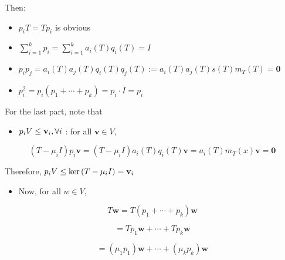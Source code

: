 \documentclass[11pt]{article}
\begin{document}
Then:

\begin{itemize}
\item \({p}_{i}T = T{p}_{i}\) is obvious
\end{itemize}

\begin{itemize}
\item \(\mathop{\sum }\limits_{{i = 1}}^{k}{p}_{i} = \mathop{\sum }\limits_{{i = 1}}^{k}{a}_{i}\left( T\right) {q}_{i}\left( T\right)  = I\)
\end{itemize}

\begin{itemize}
\item \({p}_{i}{p}_{j} = {a}_{i}\left( T\right) {a}_{j}\left( T\right) {q}_{i}\left( T\right) {q}_{j}\left( T\right)  \mathrel{\text{ := }} {a}_{i}\left( T\right) {a}_{j}\left( T\right) s\left( T\right) {m}_{T}\left( T\right)  = \mathbf{0}\)
\end{itemize}

\begin{itemize}
\item \({p}_{i}^2 = {p}_{i}\left( {{p}_1 + \cdots  + {p}_{k}}\right)  = {p}_{i} \cdot  I = {p}_{i}\)
\end{itemize}

For the last part, note that

\begin{itemize}
\item \({p}_{i}V \leq  {\bf v}_{i},\forall i\) : for all \(\mathbf{v} \in  V\),
\end{itemize}

\[
\left( {T - {\mu }_{i}I}\right) {p}_{i}\mathbf{v} = \left( {T - {\mu }_{i}I}\right) {a}_{i}\left( T\right) {q}_{i}\left( T\right) \mathbf{v} = {a}_{i}\left( T\right) {m}_{T}\left( x\right) \mathbf{v} = \mathbf{0}
\]

Therefore, \({p}_{i}V \leq  \ker \left( {T - {\mu }_{i}I}\right)  = {\bf v}_{i}\)

\begin{itemize}
\item Now, for all \(w \in  V\),
\end{itemize}

\[
T\mathbf{w} = T\left( {{p}_1 + \cdots  + {p}_{k}}\right) \mathbf{w}
\]

\[
= T{p}_1\mathbf{w} + \cdots  + T{p}_{k}\mathbf{w}
\]

\[
= \left( {{\mu }_1{p}_1}\right) \mathbf{w} + \cdots  + \left( {{\mu }_{k}{p}_{k}}\right) \mathbf{w}
\]
\end{document}

